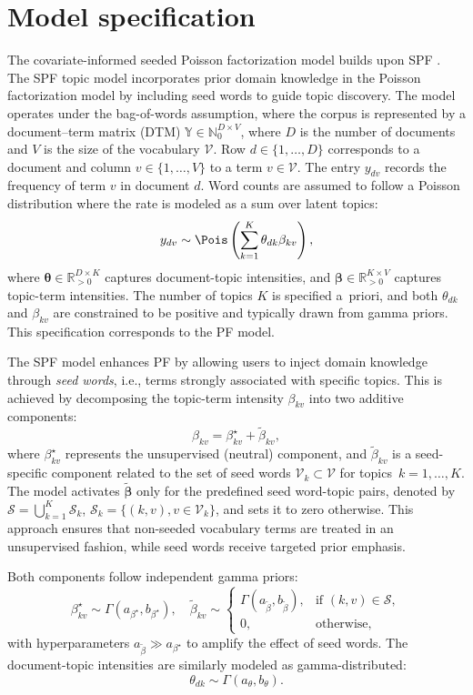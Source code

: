 \section{Model specification}\label{sec:model_cspf}


The covariate-informed seeded Poisson factorization model builds upon SPF \citep{PROSTMAIER2025114116}. The SPF topic model incorporates prior domain knowledge in the Poisson factorization model by including seed words to guide topic discovery. The model operates under the bag-of-words assumption, where the corpus is represented by a document–term matrix (DTM) $\mathbb{Y}\in\mathbb{N}_0^{D\times V}$, where $D$ is the number of documents and $V$ is the size of the vocabulary $\mathcal{V}$. Row $d\in\{1,\ldots,D\}$ corresponds to a document and column $v\in\{1,\ldots,V\}$ to a term $v\in\mathcal{V}$. The entry $y_{dv}$ records the frequency of term $v$ in document $d$. Word counts are assumed to follow a Poisson distribution where the rate is modeled as a sum over latent topics:
\[
y_{dv} \sim \Pois\left( \sum_{k=1}^K \theta_{dk} \beta_{kv} \right),
\]
where $\bm{\theta} \in \mathbb{R}_{>0}^{D \times K}$ captures document-topic intensities, and $\bm{\beta} \in \mathbb{R}_{>0}^{K \times V}$ captures topic-term intensities. The number of topics $K$ is specified a~priori, and both $\theta_{dk}$ and $\beta_{kv}$ are constrained to be positive and typically drawn from gamma priors. This specification corresponds to the PF model.

The SPF model enhances PF by allowing users to inject domain knowledge through \emph{seed words}, i.e., terms strongly associated with specific topics. This is achieved by decomposing the topic-term intensity $\beta_{kv}$ into two additive components:
\[
\beta_{kv} = \beta_{kv}^\star + \widetilde{\beta}_{kv},
\]
where $\beta_{kv}^\star$ represents the unsupervised (neutral) component, and $\widetilde{\beta}_{kv}$ is a seed-specific component related to the set of seed words $\mathcal{V}_k \subset \mathcal{V}$ for topics~$k=1,\ldots, K$. The model activates $\bm{\widetilde{\beta}}$ only for the predefined seed word-topic pairs, denoted by $\mathcal{S} = \bigcup_{k=1}^K \mathcal{S}_k$, $\mathcal{S}_k = \{(k,v), v\in \mathcal{V}_k\}$, and sets it to zero otherwise. This approach ensures that non-seeded vocabulary terms are treated in an unsupervised fashion, while seed words receive targeted prior emphasis.

Both components follow independent gamma priors:
\[
\beta_{kv}^\star \sim \Gamma(a_{\beta^\star}, b_{\beta^\star}), \quad
\widetilde{\beta}_{kv} \sim 
\begin{cases}
\Gamma(a_{\widetilde{\beta}}, b_{\widetilde{\beta}}), & \text{if } (k,v) \in \mathcal{S}, \\
0, & \text{otherwise},
\end{cases}
\]
with hyperparameters $a_{\widetilde{\beta}} \gg a_{\beta^\star}$ to amplify the effect of seed words. The document-topic intensities are similarly modeled as gamma-distributed:
\[
\theta_{dk} \sim \Gamma(a_\theta, b_\theta).
\]

